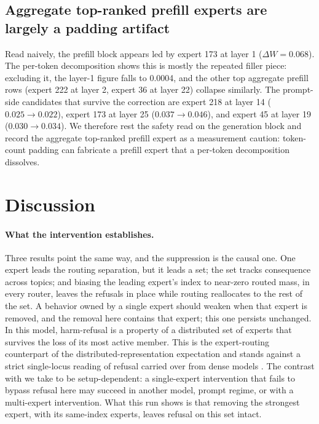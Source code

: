 \documentclass[10pt,twocolumn]{article}
\begin{document}
\subsection{Aggregate top-ranked prefill experts are largely a padding artifact}
\label{sec:filler}

Read naively, the prefill block appears led by expert 173 at layer 1
($\Delta W=0.068$). The per-token decomposition shows this is mostly the
repeated filler piece: excluding it, the layer-1 figure falls to 0.0004, and
the other top aggregate prefill rows (expert 222 at layer 2, expert 36 at
layer 22) collapse similarly. The prompt-side candidates that survive the
correction are expert 218 at layer 14 ($0.025\to0.022$), expert 173 at layer
25 ($0.037\to0.046$), and expert 45 at layer 19 ($0.030\to0.034$). We
therefore rest the safety read on the generation block and record the
aggregate top-ranked prefill expert as a measurement caution: token-count padding can
fabricate a prefill expert that a per-token decomposition dissolves.

\section{Discussion}
\label{sec:discussion}

\paragraph{What the intervention establishes.}
Three results point the same way, and the suppression is the causal one. One
expert leads the routing separation, but it leads a set; the set tracks
consequence across topics; and biasing the leading expert's index to
near-zero routed mass, in every router, leaves the refusals in place while
routing reallocates to the rest of the set. A behavior owned by a single
expert should weaken when that expert is removed, and the removal here
contains that expert; this one persists unchanged. In this model, harm-refusal is a
property of a distributed set of experts that survives the loss of its most
active member. This is the expert-routing counterpart of the
distributed-representation expectation
\citep{elhage2022superposition,bricken2023monosemanticity} and stands against
a strict single-locus reading of refusal carried over from dense models
\citep{arditi2024refusal}. The contrast with \citet{lai2025safex} we take to
be setup-dependent: a single-expert intervention that fails to bypass refusal
here may succeed in another model, prompt regime, or with a multi-expert
intervention. What this run shows is that removing the strongest expert, with its
same-index experts, leaves refusal on this set intact.
\end{document}
